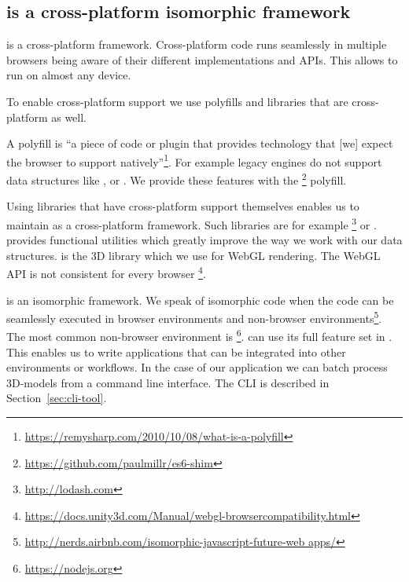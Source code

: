 \documentclass[../../ClassicThesis.tex]{subfiles}
\begin{document}


\subsection{{\convertify} is a cross-platform isomorphic framework}
\label{sec:convertify-is-isomorphic}

{\convertify} is a cross-platform framework. Cross-platform
{\javascript} code runs seamlessly in multiple browsers
being aware of their different implementations and APIs.
This allows {\convertify} to run on almost any device.

To enable cross-platform {\javascript} support we use
polyfills and libraries that are cross-platform as well.

A polyfill is \enquote{a piece of code or plugin that
  provides technology that [we] expect the browser to
  support
  natively}\footnote{\url{https://remysharp.com/2010/10/08/what-is-a-polyfill}}.
For example legacy {\javascript} engines do not support data
structures like ,  or
. We provide these features with the
\footnote{\url{https://github.com/paulmillr/es6-shim}}
polyfill.

Using libraries that have cross-platform support themselves enables us
to maintain {\convertify} as a cross-platform framework. Such
libraries are for example
\footnote{\url{http://lodash.com}} or {\threejs}.
 provides functional utilities which greatly improve the
way we work with our data structures. {\threejs} is the 3D library
which we use for WebGL rendering. The WebGL API is not consistent for every browser
\footnote{\url{https://docs.unity3d.com/Manual/webgl-browsercompatibility.html}}.


{\convertify} is an isomorphic framework. We speak of
isomorphic {\javascript} code when the code can be
seamlessly executed in browser environments and non-browser
environments\footnote{\url{http://nerds.airbnb.com/isomorphic-javascript-future-web
    apps/}}. The most common non-browser {\javascript}
environment is {\nodejs}\footnote{\url{https://nodejs.org}}.
{\convertify} can use its full feature set in {\nodejs}.
This enables us to write applications that can be integrated
into other environments or workflows. In the case of our
application {\platener} we can batch process 3D-models from
a command line interface. The CLI is described in
Section~\ref{sec:cli-tool}.
\end{document}
